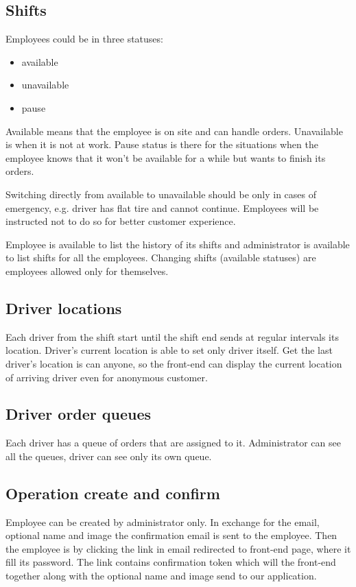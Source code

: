 		\subsection{Shifts}
		 Employees could be in three statuses: 
			\begin{itemize}
				\item available
				\item unavailable
				\item pause
			\end{itemize}
			Available means that the employee is on site and can handle orders. Unavailable is when it is not at work. Pause status is there for the situations when the employee knows that it won't be available for a while but wants to finish its orders.
			
			Switching directly from available to unavailable should be only in cases of emergency, e.g. driver has flat tire and cannot continue. Employees will be instructed not to do so for better customer experience. 
			
			Employee is available to list the history of its shifts and administrator is available to list shifts for all the employees. Changing shifts (available statuses) are employees allowed only for themselves.
		
		\subsection{Driver locations}
			Each driver from the shift start until the shift end sends at regular intervals its location. Driver's current location is able to set only driver itself. Get the last  driver's location is can anyone, so the front-end can display the current location of arriving driver even for anonymous customer. 
		
		\subsection{Driver order queues}
			Each driver has a queue of orders that are assigned to it. Administrator can see all the queues, driver can see only its own queue.
	
		\subsection{Operation create and confirm}
			Employee can be created by administrator only. In exchange for the email, optional name and image the confirmation email is sent to the employee. Then the employee is by clicking the link in email redirected to front-end page, where it fill its password. The link contains confirmation token which will the front-end together along with the optional name and image send to our application.
	
